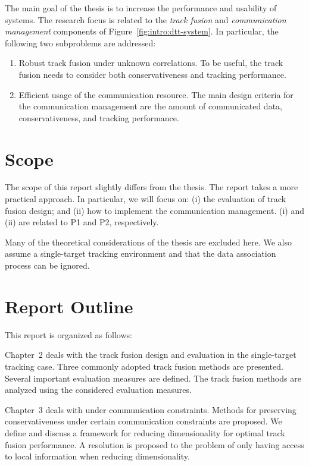 The main goal of the thesis is to increase the performance and usability of \abbrDTT systems. The research focus is related to the \emph{track fusion} and \emph{communication management} components of Figure~\ref{fig:intro:dtt-system}. In particular, the following two subproblems are addressed:
\begin{enumerate}[label=P\arabic*]
	\item Robust track fusion under unknown correlations. To be useful, the track fusion needs to consider both conservativeness and tracking performance.
	\item Efficient usage of the communication resource. The main design criteria for the communication management are the amount of communicated data, conservativeness, and tracking performance.
\end{enumerate}





\section{Scope}

The scope of this report slightly differs from the thesis. The report takes a more practical approach. In particular, we will focus on: (i) the evaluation of track fusion design; and (ii) how to implement the communication management. (i) and (ii) are related to P1 and P2, respectively.

Many of the theoretical considerations of the thesis are excluded here. We also assume a single-target tracking environment and that the data association process can be ignored.



\section{Report Outline}

This report is organized as follows:

Chapter~2 deals with the track fusion design and evaluation in the single-target tracking case. Three commonly adopted track fusion methods are presented. Several important evaluation measures are defined. The track fusion methods are analyzed using the considered evaluation measures.

Chapter~3 deals with \abbrDTT under communication constraints. Methods for preserving conservativeness under certain communication constraints are proposed. We define and discuss a framework for reducing dimensionality for optimal track fusion performance. A resolution is proposed to the problem of only having access to local information when reducing dimensionality.

